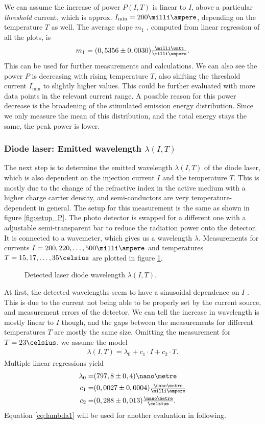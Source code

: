 We can assume the increase of power $P(I,T)$ is linear to $I$, above a particular \emph{threshold} current, which is approx. $I_\text{min}=200\milli\ampere$, depending on the temperature $T$ as well. The average slope $m_1$ , computed from linear regression of all the plots, is
\begin{align}
m_1=(0,5356\pm 0,0030)\tfrac{\milli\watt}{\milli\ampere}.
\label{eq:avg_slope1}
\end{align}
This can be used for further measurements and calculations.
We can also see the power $P$ is decreasing with rising temperature $T$, also shifting the threshold current $I_\text{min}$ to slightly higher values. This could be further evaluated with more data points in the relevant current range.
A possible reason for this power decrease is the broadening of the stimulated emission energy distribution. Since we only measure the mean of this distribution, and the total energy stays the same, the peak power is lower.
\subsubsection{Diode laser: Emitted wavelength $\lambda(I,T)$}
\label{sec:diode_laser_lambda}
The next step is to determine the emitted wavelength $\lambda(I,T)$ of the diode laser, which is also dependent on the injection current $I$ and the temperature $T$. This is mostly due to the change of the refractive index in the active medium with a higher charge carrier density, and semi-conductors are very temperature-dependent in general.
The setup for this measurement is the same as shown in figure \ref{fig:setup_P}. The photo detector is swapped for a different one with a adjustable semi-transparent bar to reduce the radiation power onto the detector. It is connected to a wavemeter, which gives us a wavelength $\lambda$.
Measurements for currents $I=200,220,\dots,500\milli\ampere$ and temperatures $T=15,17,\dots,35\celsius$ are plotted in figure \ref{fig:lambda1}.

\begin{figure}[h]
	\centering
	
	\caption{Detected laser diode wavelength $\lambda(I,T)$.}
	\label{fig:lambda1}
\end{figure}

At first, the detected wavelengths seem to have a sinusoidal dependence on $I$ . This is due to the current not being able to be properly set by the current source, and measurement errors of the detector. We can tell the increase in wavelength is mostly linear to $I$ though, and the gaps between the measurements for different temperatures $T$ are mostly the same size.
Omitting the measurement for $T=23\celsius$, we assume the model
\begin{align}
\lambda(I,T)=\lambda_0+c_1\cdot I+c_2\cdot T.
\label{eq:lambda1}
\end{align}
Multiple linear regressions yield
\begin{align*}
\lambda_0=&(797,8\pm 0,4)\nano\metre\\
c_1=&(0,0027\pm 0,0004)\tfrac{\nano\metre}{\milli\ampere}\\
c_2=&(0,288\pm 0,013)\tfrac{\nano\metre}{\celsius}.
\end{align*}
Equation \eqref{eq:lambda1} will be used for another evaluation in following.
